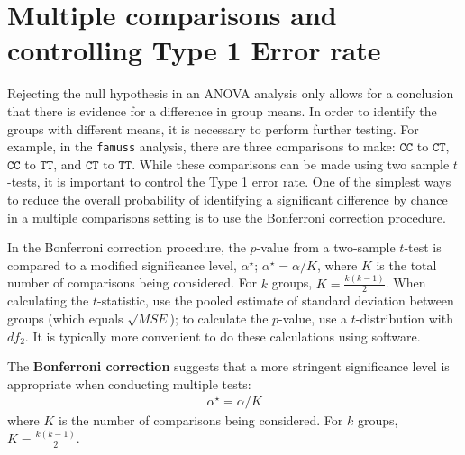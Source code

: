 \documentclass[
  letterpaper,
  DIV=11,
  numbers=noendperiod,
  oneside]{scrreprt}
\begin{document}
\hypertarget{multiple-comparisons-and-controlling-type-1-error-rate}{%
\section{Multiple comparisons and controlling Type 1 Error
rate}\label{multiple-comparisons-and-controlling-type-1-error-rate}}

Rejecting the null hypothesis in an ANOVA analysis only allows for a
conclusion that there is evidence for a difference in group means. In
order to identify the groups with different means, it is necessary to
perform further testing. For example, in the \texttt{famuss} analysis,
there are three comparisons to make: \(\texttt{CC}\) to \(\texttt{CT}\),
\(\texttt{CC}\) to \(\texttt{TT}\), and \(\texttt{CT}\) to
\(\texttt{TT}\). While these comparisons can be made using two sample
\(t\)-tests, it is important to control the Type 1 error rate. One of
the simplest ways to reduce the overall probability of identifying a
significant difference by chance in a multiple comparisons setting is to
use the Bonferroni correction procedure.

In the Bonferroni correction procedure, the \(p\)-value from a
two-sample \(t\)-test is compared to a modified significance level,
\(\alpha^\star\); \(\alpha^\star = \alpha/K\), where \(K\) is the total
number of comparisons being considered. For \(k\) groups,
\(K=\frac{k(k-1)}{2}\). When calculating the \(t\)-statistic, use the
pooled estimate of standard deviation between groups (which equals
\(\sqrt{MSE}\)); to calculate the \(p\)-value, use a \(t\)-distribution
with \(df_2\). It is typically more convenient to do these calculations
using software.

\begin{tcolorbox}[enhanced jigsaw, toprule=.15mm, colbacktitle=quarto-callout-note-color!10!white, title=\textcolor{quarto-callout-note-color}{\faInfo}\hspace{0.5em}{Bonferroni correction}, arc=.35mm, colframe=quarto-callout-note-color-frame, colback=white, titlerule=0mm, left=2mm, bottomtitle=1mm, bottomrule=.15mm, breakable, opacitybacktitle=0.6, leftrule=.75mm, toptitle=1mm, coltitle=black, rightrule=.15mm, opacityback=0]

The \textbf{Bonferroni correction} suggests that a more stringent
significance level is appropriate when conducting multiple tests:
\begin{align*}
\alpha^\star = \alpha / K
\end{align*} where \(K\) is the number of comparisons being considered.
For \(k\) groups, \(K=\frac{k(k-1)}{2}\).

\end{tcolorbox}
\end{document}
